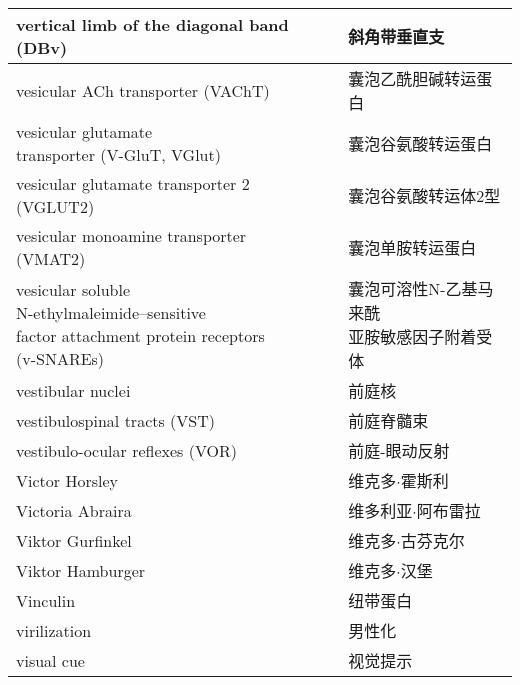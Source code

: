 \begin{longtable}{lll}
	\midrule
	vertical limb of the diagonal band (DBv)    &&  斜角带垂直支  \\
	
	\midrule
	vesicular ACh transporter (VAChT)   && 囊泡乙酰胆碱转运蛋白  \\
	
	\midrule
	\makecell[l]{vesicular glutamate \\transporter (V-GluT, VGlut)}   && 囊泡谷氨酸转运蛋白  \\
	
	\midrule
	vesicular glutamate transporter 2 (VGLUT2)   && 囊泡谷氨酸转运体2型  \\
	
	\midrule
	vesicular monoamine transporter (VMAT2)   && 囊泡单胺转运蛋白  \\
	
	\midrule
	\makecell[l]{vesicular soluble \\N-ethylmaleimide–sensitive \\factor attachment protein receptors\\ (v-SNAREs)}  && \makecell[l]{囊泡可溶性N-乙基马来酰\\亚胺敏感因子附着受体}  \\
	
	\midrule
	vestibular nuclei   && 前庭核  \\
	
	\midrule
	vestibulospinal tracts (VST)   && 前庭脊髓束  \\
	
	\midrule
	vestibulo-ocular reflexes (VOR)   && 前庭-眼动反射  \\
	
	\midrule
	Victor Horsley   && 维克多$\cdot$霍斯利  \\
	
	\midrule
	Victoria Abraira   && 维多利亚$\cdot$阿布雷拉  \\
	
	\midrule
	Viktor Gurfinkel   && 维克多$\cdot$古芬克尔  \\
	
	\midrule
	Viktor Hamburger   && 维克多$\cdot$汉堡  \\
	
	\midrule
	Vinculin   && 纽带蛋白  \\
	
	\midrule
	virilization   && 男性化  \\
	
	\midrule
	visual cue   && 视觉提示  \\
	

\end{longtable}
